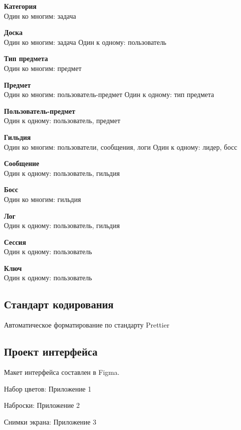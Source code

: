 \documentclass[../document.tex]{subfiles}
\begin{document}
\par \textbf{Категория}\\
Один ко многим: задача

\par \textbf{Доска}\\
Один ко многим: задача
Один к одному: пользователь

\par \textbf{Тип предмета}\\
Один ко многим: предмет

\par \textbf{Предмет}\\
Один ко многим: пользователь-предмет
Один к одному: тип предмета

\par \textbf{Пользователь-предмет}\\
Один к одному: пользователь, предмет

\par \textbf{Гильдия}\\
Один ко многим: пользователи, сообщения, логи
Один к одному: лидер, босс

\par \textbf{Сообщение}\\
Один к одному: пользователь, гильдия

\par \textbf{Босс}\\
Один ко многим: гильдия

\par \textbf{Лог}\\
Один к одному: пользователь, гильдия

\par \textbf{Сессия}\\
Один к одному: пользователь

\par \textbf{Ключ}\\
Один к одному: пользователь

\subsection{Стандарт кодирования}
\par Автоматическое форматирование по стандарту Prettier
\subsection{Проект интерфейса}
\par Макет интерфейса составлен в Figma.

\par Набор цветов: Приложение 1

\par Наброски: Приложение 2

\par Снимки экрана: Приложение 3
\end{document}
